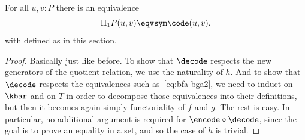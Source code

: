 %
\begin{thm}\label{thm:van-Kampen}
  For all $u,v:P$ there is an equivalence
  \[ \Pi_1P(u,v) \eqvsym \code(u,v). \]
  with \code defined as in this section.
\end{thm}

\begin{proof}
  Basically just like before.
  To show that $\decode$ respects the new generators of the quotient relation, we use the naturality of $h$.
  And to show that $\decode$ respects the equivalences such as~\eqref{eq:bfa-bga2}, we need to induct on $\kbar$ and on $T$ in order to decompose those equivalences into their definitions, but then it becomes again simply functoriality of $f$ and $g$.
  The rest is easy.
  In particular, no additional argument is required for $\encode\circ\decode$, since the goal is to prove an equality in a set, and so the case of $h$ is trivial.
\end{proof}
